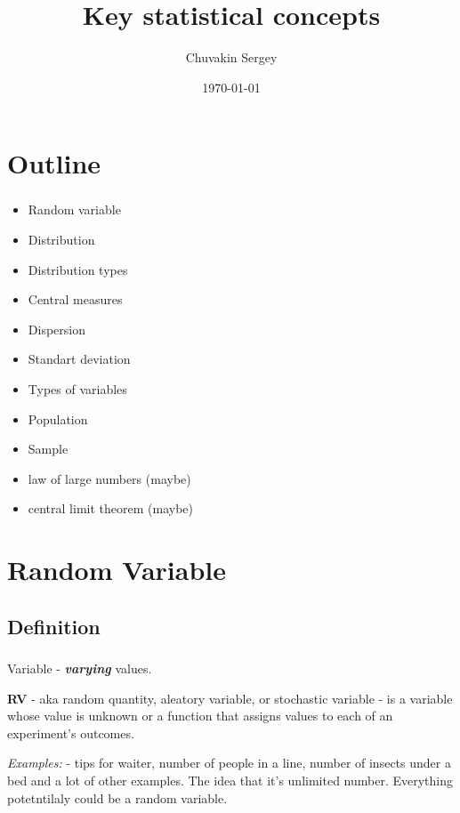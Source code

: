 \documentclass[t, 11pt]{beamer}
\title {Key statistical concepts}
\subtitle{}
\author{Chuvakin Sergey}
\date{\today}
\institute[<<Anthropology>>]{<<School of Advanced Studies>>}
\begin{document}
	
	\frame[plain]{\titlepage}		
	
	\section{Outline}
	
		\begin{frame} 
			\frametitle{\insertsection} 
			\begin{itemize}
				\item Random variable
				\item Distribution
				\item Distribution types
				\item Central measures
				\item Dispersion 
				\item Standart deviation 
				\item Types of variables 
				\item Population
				\item Sample
				\item law of large numbers (maybe)
				\item central limit theorem (maybe)
			\end{itemize}
		\end{frame}
	
	\section{Random Variable}
		\subsection{Definition}

	\begin{frame} 
		\frametitle{\insertsection} 
		\framesubtitle{\insertsubsection}
	Variable - \textbf{\emph{varying}} values. 
		
	\textbf{RV} - aka  random quantity, aleatory variable, or stochastic variable - is a variable whose value is unknown or a function that assigns values to each of an experiment's outcomes.
	
	\vspace{1cm}
	
	\emph{Examples:} - tips for waiter, number of people in a line, number of insects under a bed and a lot of other examples. The idea that it's unlimited number. Everything potetntilaly could be a random variable. 
	\end{frame}
	
\end{document}
